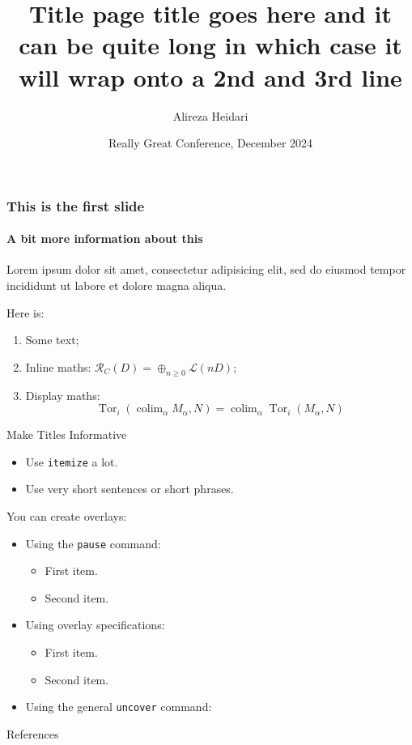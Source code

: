 \documentclass[aspectratio=169]{beamer}
\title[My Talk]{Title page title goes here and it can be quite long in which case it will wrap onto a 2nd and 3rd line}
\author{Alireza Heidari}
\institute{Simon Fraser University}
\date[December 2024]{Really Great Conference, December 2024}
\begin{document}
\begin{frame}[plain]
    \titlepage
\end{frame}

\begin{frame}
  \frametitle{This is the first slide}
  \framesubtitle{A bit more information about this}
  
  Lorem ipsum dolor sit amet, consectetur adipisicing elit, sed do eiusmod tempor incididunt ut labore et dolore magna aliqua.
  
  Here is:
  \begin{enumerate}
      \item Some text;
      \item Inline maths: $\mathcal{R}_C(D)=\oplus_{n\geqslant0}\mathcal{L}(nD)$;
      \item Display maths:
      \[
          \operatorname{Tor}_i(\operatorname{colim}_\alpha M_\alpha, N) = \operatorname{colim}_\alpha\operatorname{Tor}_i(M_\alpha, N)
      \]
  \end{enumerate}
\end{frame}

\begin{frame}{Make Titles Informative}
  \begin{itemize}
      \item Use \texttt{itemize} a lot.
      \item Use very short sentences or short phrases.
  \end{itemize}
  You can create overlays:
  \begin{itemize}
      \item Using the \texttt{pause} command:
      \begin{itemize}
          \item First item.
          \pause
          \item Second item.
      \end{itemize}
      \item Using overlay specifications:
      \begin{itemize}
          \item<3-> First item.
          \item<4-> Second item.
      \end{itemize}
      \item Using the general \texttt{uncover} command:
      \begin{itemize}
      \end{itemize}
  \end{itemize}
\end{frame}


\begin{frame}{References}
    
    
\end{frame}
\end{document}
